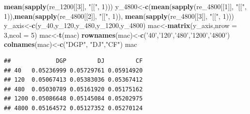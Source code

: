 \documentclass[
]{article}
\newenvironment{Shaded}{\begin{snugshade}}{\end{snugshade}}
\newcommand{\DataTypeTok}[1]{\textcolor[rgb]{0.13,0.29,0.53}{#1}}
\newcommand{\DecValTok}[1]{\textcolor[rgb]{0.00,0.00,0.81}{#1}}
\newcommand{\KeywordTok}[1]{\textcolor[rgb]{0.13,0.29,0.53}{\textbf{#1}}}
\newcommand{\NormalTok}[1]{#1}
\newcommand{\StringTok}[1]{\textcolor[rgb]{0.31,0.60,0.02}{#1}}
\begin{document}
\begin{Shaded}
\begin{Highlighting}[]
        \KeywordTok{mean}\NormalTok{(}\KeywordTok{sapply}\NormalTok{(re_}\DecValTok{1200}\NormalTok{[[}\DecValTok{3}\NormalTok{]], }\StringTok{"[["}\NormalTok{, }\DecValTok{1}\NormalTok{)))}
\NormalTok{y_}\DecValTok{4800}\NormalTok{<-}\KeywordTok{c}\NormalTok{(}\KeywordTok{mean}\NormalTok{(}\KeywordTok{sapply}\NormalTok{(re_}\DecValTok{4800}\NormalTok{[[}\DecValTok{1}\NormalTok{]], }\StringTok{"[["}\NormalTok{, }\DecValTok{1}\NormalTok{)),}\KeywordTok{mean}\NormalTok{(}\KeywordTok{sapply}\NormalTok{(re_}\DecValTok{4800}\NormalTok{[[}\DecValTok{2}\NormalTok{]], }\StringTok{"[["}\NormalTok{, }\DecValTok{1}\NormalTok{)),}
        \KeywordTok{mean}\NormalTok{(}\KeywordTok{sapply}\NormalTok{(re_}\DecValTok{4800}\NormalTok{[[}\DecValTok{3}\NormalTok{]], }\StringTok{"[["}\NormalTok{, }\DecValTok{1}\NormalTok{)))}
\NormalTok{y_axis<-}\KeywordTok{c}\NormalTok{(y_}\DecValTok{40}\NormalTok{,y_}\DecValTok{120}\NormalTok{,y_}\DecValTok{480}\NormalTok{,y_}\DecValTok{1200}\NormalTok{,y_}\DecValTok{4800}\NormalTok{)}
\NormalTok{mac<-}\KeywordTok{matrix}\NormalTok{(y_axis,}\DataTypeTok{nrow =} \DecValTok{3}\NormalTok{,}\DataTypeTok{ncol =} \DecValTok{5}\NormalTok{)}
\NormalTok{mac<-}\KeywordTok{t}\NormalTok{(mac)}
\KeywordTok{rownames}\NormalTok{(mac)<-}\KeywordTok{c}\NormalTok{(}\StringTok{'40'}\NormalTok{,}\StringTok{'120'}\NormalTok{,}\StringTok{'480'}\NormalTok{,}\StringTok{'1200'}\NormalTok{,}\StringTok{'4800'}\NormalTok{)}
\KeywordTok{colnames}\NormalTok{(mac)<-}\KeywordTok{c}\NormalTok{(}\StringTok{"DGP"}\NormalTok{, }\StringTok{"DJ"}\NormalTok{,}\StringTok{"CF"}\NormalTok{)}
\NormalTok{mac}
\end{Highlighting}
\end{Shaded}

\begin{verbatim}
##             DGP         DJ         CF
## 40   0.05236999 0.05729761 0.05914920
## 120  0.05067413 0.05383036 0.05367412
## 480  0.05030789 0.05161920 0.05175162
## 1200 0.05086648 0.05145084 0.05202975
## 4800 0.05164572 0.05127352 0.05270124
\end{verbatim}
\end{document}
